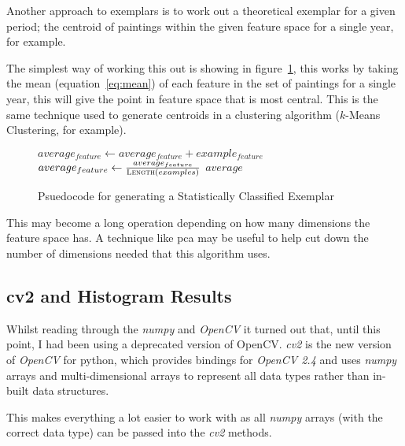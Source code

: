 Another approach to exemplars is to work out a theoretical exemplar for a given period; the 
centroid of paintings within the given feature space for a single year, for example.

The simplest way of working this out is showing in figure~\ref{fig:sce-psuedo}, this works by 
taking the mean (equation~\ref{eq:mean}) of each feature in the set of paintings for a single 
year, this will give the point in feature space that is most central. This is the same technique
used to generate centroids in a clustering algorithm ($k$-Means Clustering, for example).

\begin{figure}[h]
\begin{algorithmic}
\State $average_{feature} \gets average_{feature} + example_{feature}$
\EndFor
\EndFor
{}
\State$average_{feature} \gets \frac{average_{feature}}{\Call{Length}{examples}}$
\EndFor
\State \Return $average$
\EndFunction
\end{algorithmic}
\caption{Psuedocode for generating a Statistically Classified Exemplar}\label{fig:sce-psuedo}
\end{figure}

This may become a long operation depending on how many dimensions the feature space has. A
technique like \gls{pca} may be useful to help cut down the number of dimensions needed that this
algorithm uses.

\subsection{cv2 and Histogram Results}
Whilst reading through the 
\emph{numpy}\cite{EricJonesandTravisOliphantandPearuPetersonandothers2001SciPy} and \emph{OpenCV} 
it turned out that, until this point, I had been using a deprecated version of OpenCV. \emph{cv2} 
is the new version of \emph{OpenCV} for python, which provides bindings for \emph{OpenCV 2.4} and 
uses \emph{numpy} arrays and multi-dimensional arrays to represent all data types rather than 
in-built data structures.

This makes everything a lot easier to work with as all \emph{numpy} arrays (with the correct data type)
can be passed into the \emph{cv2} methods.

